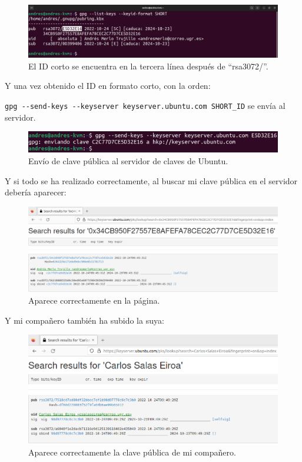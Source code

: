 \documentclass{article}
\begin{document}
\begin{figure}[H]
    \includegraphics[width=\textwidth]{imagenes/Portatil/Captura desde 2022-10-24 11-54-58.png}
    \caption{El ID corto se encuentra en la tercera línea después de ``rsa3072/''.}
\end{figure}

Y una vez obtenido el ID en formato corto, con la orden:

\verb|gpg --send-keys --keyserver keyserver.ubuntu.com SHORT_ID| se envía al servidor. 

\begin{figure}[H]
    \includegraphics[width=\textwidth]{imagenes/Portatil/Captura desde 2022-10-24 11-58-08.png}
    \caption{Envío de clave pública al servidor de claves de Ubuntu.}
\end{figure}

Y si todo se ha realizado correctamente, al buscar mi clave pública en el servidor debería aparecer:


\begin{figure}[H]
    \includegraphics[width=\textwidth]{imagenes/Portatil/Captura desde 2022-10-24 12-01-53.png}
    \caption{Aparece correctamente en la página.}
\end{figure}

\newpage

Y mi compañero también ha subido la suya:

\begin{figure}[H]
    \includegraphics[width=\textwidth]{imagenes/Portatil/Captura desde 2022-10-24 12-05-30.png}
    \caption{Aparece correctamente la clave pública de mi compañero.}
\end{figure}
\end{document}
